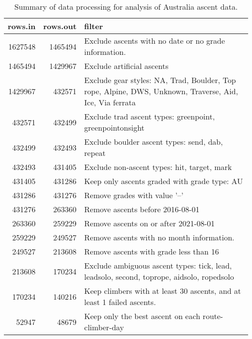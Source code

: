 \begin{table}[ht]
\centering
\begingroup\fontsize{9pt}{10pt}\selectfont
\begin{tabular}{rrl}
  \hline
{\bf rows.in} & {\bf rows.out} & {\bf filter} \\ 
  \hline
1627548 & 1465494 & Exclude ascents with no date or no grade information. \\ 
  1465494 & 1429967 & Exclude artificial ascents \\ 
  1429967 & 432571 & Exclude gear styles: NA, Trad, Boulder, Top rope, Alpine, DWS, Unknown, Traverse, Aid, Ice, Via ferrata \\ 
  432571 & 432499 & Exclude trad ascent types: greenpoint, greenpointonsight \\ 
  432499 & 432493 & Exclude boulder ascent types: send, dab, repeat \\ 
  432493 & 431405 & Exclude non-ascent types: hit, target, mark \\ 
  431405 & 431286 & Keep only ascents graded with grade type: AU \\ 
  431286 & 431276 & Remove grades with value '--' \\ 
  431276 & 263360 & Remove ascents before 2016-08-01 \\ 
  263360 & 259229 & Remove ascents on or after 2021-08-01 \\ 
  259229 & 249527 & Remove ascents with no month information. \\ 
  249527 & 213608 & Remove ascents with grade less than 16 \\ 
  213608 & 170234 & Exclude ambiguous ascent types: tick, lead, leadsolo, second, toprope, aidsolo, ropedsolo \\ 
  170234 & 140216 & Keep climbers with at least 30 ascents, and at least 1 failed ascents. \\ 
  52947 & 48679 & Keep only the best ascent on each route-climber-day \\ 
   \hline
\end{tabular}
\endgroup
\caption{Summary of data processing for analysis of Australia ascent data.} 
\label{table-data-processing-aus}
\end{table}
